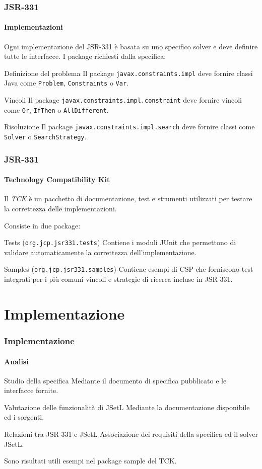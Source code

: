 \documentclass{beamer}
\begin{document}
\begin{frame}
\frametitle{JSR-331}
\framesubtitle{Implementazioni}
Ogni implementazione del JSR-331 è basata su uno specifico solver e deve
definire tutte le interfacce.
I package richiesti dalla specifica:
\pause
\begin{block}{Definizione del problema}
Il package \alert{\texttt{javax.constraints.impl}} deve fornire
classi Java come \texttt{Problem}, \texttt{Constraints} o \texttt{Var}.
\end{block}
\pause
\begin{block}{Vincoli}
Il package \alert{\texttt{javax.constraints.impl.constraint}} deve
fornire vincoli come \texttt{Or}, \texttt{IfThen} o \texttt{AllDifferent}.
\end{block}
\pause
\begin{block}{Risoluzione}
Il package \alert{\texttt{javax.constraints.impl.search}} deve
fornire classi come \texttt{Solver} o \texttt{SearchStrategy}.
\end{block}
\end{frame}

\begin{frame}
\frametitle{JSR-331}
\framesubtitle{Technology Compatibility Kit}
Il \emph{TCK}  è un pacchetto di documentazione, test e  strumenti utilizzati
per testare la correttezza delle implementazioni.
\pause

\vspace{5pt}
Consiste in due package:
\pause
\begin{block}{Tests (\alert{\texttt{org.jcp.jsr331.tests}})}
Contiene i moduli JUnit che permettono di validare automaticamente la
correttezza dell'implementazione.
\end{block}
\pause
\begin{block}{Samples (\alert{\texttt{org.jcp.jsr331.samples}})}
Contiene esempi di CSP che forniscono test integrati per i più comuni vincoli e
strategie di ricerca incluse in JSR-331.
\end{block}
\end{frame}

\section{Implementazione}
\begin{frame}
\frametitle{Implementazione}
\framesubtitle{Analisi}
\begin{block}{Studio della specifica}
Mediante il documento di specifica pubblicato e le interfacce fornite.
\end{block}
\pause
\begin{block}{Valutazione delle funzionalità di JSetL}
Mediante la documentazione disponibile ed i sorgenti.
\end{block}
\pause
\begin{block}{Relazioni tra JSR-331 e JSetL}
Associazione dei requisiti della specifica ed il solver JSetL.
\end{block}

\pause
\par Sono risultati utili \alert{esempi} nel package \alert{sample} del TCK.
\end{frame}
\end{document}
